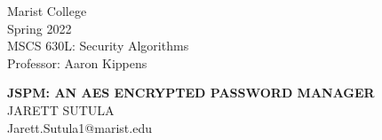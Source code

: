 


\begin{titlepage} %

	
\begin{minipage}{0.4\textwidth} %
    \begin{flushleft} %
    \large
    Marist College\\ %
    Spring 2022\\ %
    MSCS 630L: Security Algorithms\\ %
    Professor: Aaron Kippens %
    \end{flushleft}
\end{minipage}
	
\vspace*{2in} %
	
\center %

	
{\huge\bfseries JSPM: AN AES ENCRYPTED PASSWORD MANAGER}\\[0.4cm] %
JARETT SUTULA \\ %
Jarett.Sutula1@marist.edu \\ %
	
\vfill %


\vfill %



\vfill %


\vfill %
	
	

	
\end{titlepage}